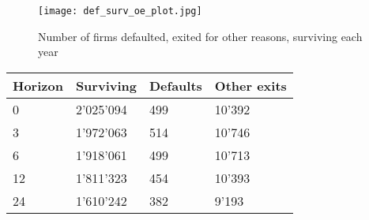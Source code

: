 \begin{figure}[H]
    \centering
    \texttt{[image: def\_surv\_oe\_plot.jpg]}
    \caption{Number of firms defaulted, exited for other reasons, surviving each year}
    \label{fig:defsurv}
\end{figure}

\begin{table}[]
    \centering
    \begin{tabular}{l l l l}
    \hline\hline
Horizon & Surviving & Defaults & Other exits \\
    \hline
0 &  2'025'094 & 499 & 10'392\\
3 &  1'972'063 & 514 & 10'746\\
6 &  1'918'061 & 499 & 10'713\\
12 &  1'811'323 & 454 & 10'393\\
24 &  1'610'242 & 382 & 9'193\\

\end{tabular}
\end{table}
